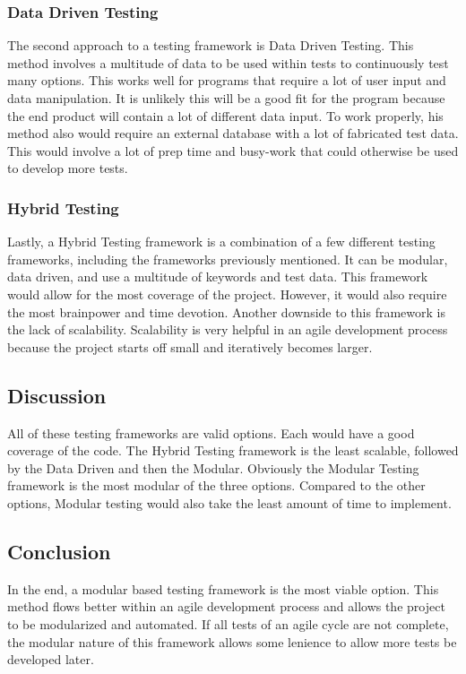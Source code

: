 \documentclass[onecolumn, draftclsnofoot,10pt, compsoc]{IEEEtran}
\begin{document}
\subsubsection{Data Driven Testing}
The second approach to a testing framework is Data Driven Testing. This method involves a multitude of data to be used within tests to continuously test many options. This works well for programs that require a lot of user input and data manipulation. It is unlikely this will be a good fit for the program because the end product will contain a lot of different data input. To work properly, his method also would require an external database with a lot of fabricated test data. This would involve a lot of prep time and busy-work that could otherwise be used to develop more tests.
\subsubsection{Hybrid Testing}
Lastly, a Hybrid Testing framework is a combination of a few different testing frameworks, including the frameworks previously mentioned. It can be modular, data driven, and use a multitude of keywords and test data. This framework would allow for the most coverage of the project. However, it would also require the most brainpower and time devotion. Another downside to this framework is the lack of scalability. Scalability is very helpful in an agile development process because the project starts off small and iteratively becomes larger.
\subsection{Discussion}
All of these testing frameworks are valid options. Each would have a good coverage of the code. The Hybrid Testing framework is the least scalable, followed by the Data Driven and then the Modular. Obviously the Modular Testing framework is the most modular of the three options. Compared to the other options, Modular testing would also take the least amount of time to implement.

\subsection{Conclusion}
In the end, a modular based testing framework is the most viable option. This method flows better within an agile development process and allows the project to be modularized and automated. If all tests of an agile cycle are not complete, the modular nature of this framework allows some lenience to allow more tests be developed later.\cite{Software_Testing_Help}
\newpage


\end{document}
